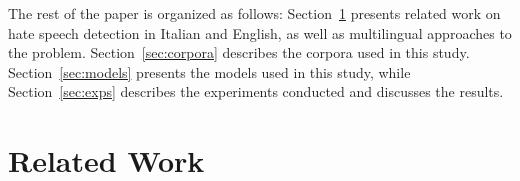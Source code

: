 \documentclass[11pt]{article}
\newcommand{\todoP}[1]{\todo[color=red]{P: #1}}
\newcommand{\mbert}{\mbox{mBERT$_{base}$}}
\newcommand{\umbert}{\mbox{UmBERTo}}
\newcommand{\albert}{\mbox{AlBERTo}}
\newcommand{\enforum}{\textit{Incels.is}}
\newcommand{\itforum}{\textit{Il forum dei brutti}}
\begin{document}
The rest of the paper is organized as follows: Section~\ref{sec:related-work} presents related work on hate speech detection in Italian and English, as well as multilingual approaches to the problem. Section~\ref{sec:corpora} describes the corpora used in this study. Section~\ref{sec:models} presents the models used in this study, while Section~\ref{sec:exps} describes the experiments conducted and discusses the results. 






\section{Related Work}
\label{sec:related-work}
\end{document}
